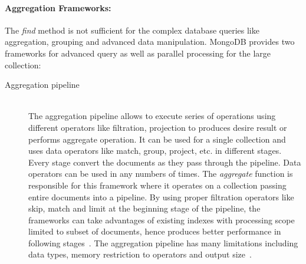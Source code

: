 \par
\paragraph{Aggregation Frameworks:}
 The \textit{find} method is not sufficient for the complex database queries like aggregation, grouping  and advanced data manipulation. MongoDB provides two frameworks for advanced query as well as parallel processing for the large collection:
 \begin{description}
		\item[Aggregation pipeline]  \hfill \\
		The aggregation pipeline allows to execute series of operations using different operators like filtration, projection to produces desire result or performs aggregate operation.  It can be used for a single collection and uses  data operators like match, group, project, etc. in different stages. Every stage convert the documents as they pass through the pipeline. Data operators can be used  in any numbers of times.  The \textit{aggregate} function is responsible for this framework where it operates on a collection passing  entire documents into a pipeline. By using proper filtration operators like  skip, match and limit at the beginning  stage of the pipeline,  the frameworks can take advantages of existing indexes with processing scope limited to subset of documents, hence produces better performance in following stages~\cite{mongodbaggregation}. The aggregation pipeline has many limitations including data types, memory restriction to operators and output size~\cite{nosql/comparision}. 
		

\end{description}
